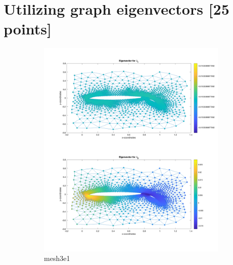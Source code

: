 \section{Utilizing graph eigenvectors [25 points]}

\begin{figure}[H]
	\centering
	\begin{subfigure}{0.5\textwidth}
		\includegraphics[width=\textwidth]{./media/eigenvector.png}
		\caption{mesh3e1}
		\label{fig:spec_crack}
	\end{subfigure}%
	~
	\begin{subfigure}{0.5\textwidth}

\end{subfigure}
\end{figure}

